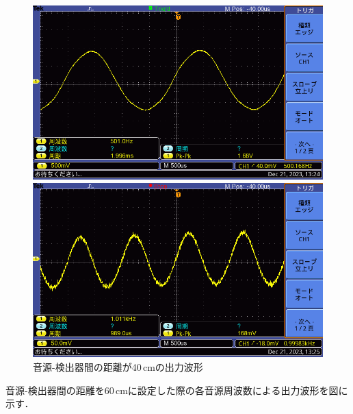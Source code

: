 \documentclass{ltjsarticle}
\begin{document}
\begin{figure}[H]
\begin{minipage}{0.4\columnwidth}
			\end{minipage}
			\hspace{0.04\columnwidth}
			\begin{minipage}{0.4\columnwidth}
			\centering
			\includegraphics[width = \columnwidth]{figs/F0034TEK.PNG}
			\end{minipage}
			\hspace{0.04\columnwidth}
			\begin{minipage}{0.4\columnwidth}
			\centering
			\includegraphics[width = \columnwidth]{figs/F0035TEK.PNG}
			\end{minipage}
			\caption{音源-検出器間の距離が40\,cmの出力波形}
			\label{fig:week5-3-40}
			\end{figure}
\clearpage
			音源-検出器間の距離を60\,cmに設定した際の各音源周波数による出力波形を図に示す．
\end{document}
